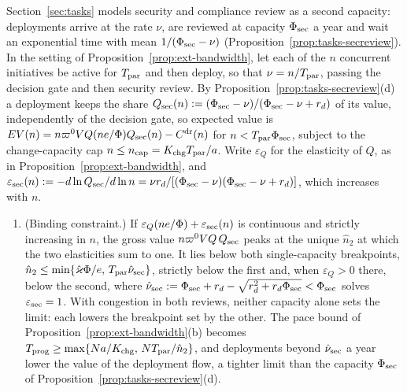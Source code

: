 \begin{remark}\label{rem:ext-seccap}
Section~\ref{sec:tasks} models security and compliance review as a second capacity: deployments arrive at the rate $\nu$, are reviewed at capacity $\Phi_{\rm sec}$ a year and wait an exponential time with mean $1/(\Phi_{\rm sec}-\nu)$ (Proposition~\ref{prop:tasks-secreview}). In the setting of Proposition~\ref{prop:ext-bandwidth}, let each of the $n$ concurrent initiatives be active for $T_{\rm par}$ and then deploy, so that $\nu=n/T_{\rm par}$, passing the decision gate and then security review. By Proposition~\ref{prop:tasks-secreview}(d) a deployment keeps the share $Q_{\rm sec}(n):=(\Phi_{\rm sec}-\nu)/(\Phi_{\rm sec}-\nu+r_d)$ of its value, independently of the decision gate, so expected value is $EV(n)=n\varpi^0VQ(ne/\Phi)Q_{\rm sec}(n)-C^{\rm dr}(n)$ for $n<T_{\rm par}\Phi_{\rm sec}$, subject to the change-capacity cap $n\le n_{\rm cap}=K_{\rm chg}T_{\rm par}/a$. Write $\varepsilon_Q$ for the elasticity of $Q$, as in Proposition~\ref{prop:ext-bandwidth}, and $\varepsilon_{\rm sec}(n):=-d\ln Q_{\rm sec}/d\ln n=\nu r_d/[(\Phi_{\rm sec}-\nu)(\Phi_{\rm sec}-\nu+r_d)]$, which increases with $n$.
\begin{enumerate}
\item[(a)] (Binding constraint.) If $\varepsilon_Q(ne/\Phi)+\varepsilon_{\rm sec}(n)$ is continuous and strictly increasing in $n$, the gross value $n\varpi^0VQ\,Q_{\rm sec}$ peaks at the unique $\hat n_2$ at which the two elasticities sum to one. It lies below both single-capacity breakpoints, $\hat n_2\le\min\{\hat\varkappa\Phi/e,\,T_{\rm par}\hat\nu_{\rm sec}\}$, strictly below the first and, when $\varepsilon_Q>0$ there, below the second, where $\hat\nu_{\rm sec}:=\Phi_{\rm sec}+r_d-\sqrt{r_d^2+r_d\Phi_{\rm sec}}<\Phi_{\rm sec}$ solves $\varepsilon_{\rm sec}=1$. With congestion in both reviews, neither capacity alone sets the limit: each lowers the breakpoint set by the other. The pace bound of Proposition~\ref{prop:ext-bandwidth}(b) becomes $T_{\rm prog}\ge\max\{Na/K_{\rm chg},\,NT_{\rm par}/\hat n_2\}$, and deployments beyond $\hat\nu_{\rm sec}$ a year lower the value of the deployment flow, a tighter limit than the capacity $\Phi_{\rm sec}$ of Proposition~\ref{prop:tasks-secreview}(d).

\end{enumerate}
\end{remark}
